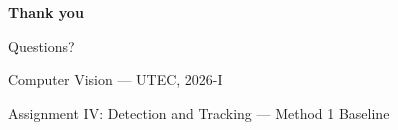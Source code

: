 {
  \begin{frame}[plain]
    \centering
    \vspace{2cm}
    {\color{white}\Huge\bfseries Thank you\par}
    \vspace{0.8em}
    {\color{uteccyan}\large Questions?\par}
    \vspace{1.5em}
    {\color{white!70}Computer Vision --- UTEC, 2026-I\par}
    \vspace{0.3em}
    {\color{white!50}\small Assignment IV: Detection and Tracking --- Method 1 Baseline\par}
  \end{frame}
}

